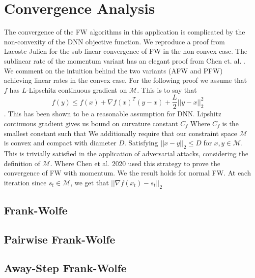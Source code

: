 \documentclass{article}
\begin{document}
\section{Convergence Analysis}
The convergence of the FW algorithms in this application is complicated by the non-convexity of the DNN objective function.
We reproduce a proof from Lacoste-Julien \cite{fw-noncovex} for the sub-linear convergence of FW in the non-convex case. The sublinear rate of the momentum variant has an elegant proof from Chen et. al. \cite{attacks}. We comment on the intuition behind the two variants (AFW and PFW) achieving linear rates in the convex case.
For the following proof we assume that $f$ has $L$-Lipschitz continuous gradient on $\mathcal{M}$. This is to say that 
$$ f(y) \leq f(x) + \nabla f(x)^T (y-x) + \frac{L}{2}||y-x||_2^2$$.
This has been shown to be a reasonable assumption for DNN. %
Lipshitz continuous gradient gives us bound on curvature constant $C_f$ %
Where $C_f$ is the smallest constant such that 
We additionally require that our constraint space $\mathcal{M}$ is convex and compact with diameter $D$. Satisfying $||x-y||_2 \leq D$ for $x,y \in \mathcal{M}$. This is trivially satisfied in the application of adversarial attacks, considering the definition of $\mathcal{M}$. 
Where Chen et al. 2020 used this strategy to prove the convergence of FW with momentum. We the result holds for normal FW. 
At each iteration since $s_t \in \mathcal{M}$, we get that $||\nabla f(x_t) - s_t||_2$

\subsection{Frank-Wolfe}
\subsection{Pairwise Frank-Wolfe}
\subsection{Away-Step Frank-Wolfe}



\end{document}
